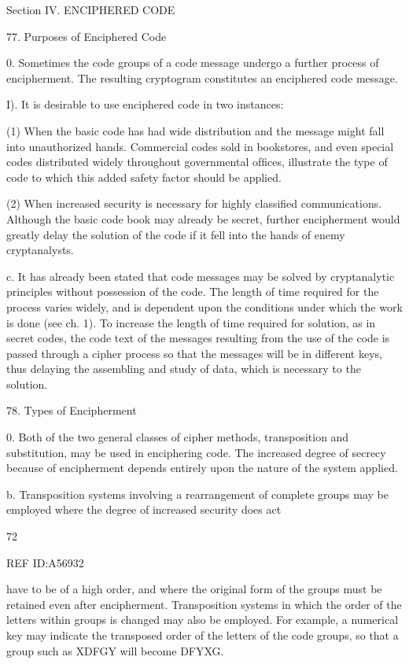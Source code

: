 Section IV. ENCIPHERED CODE

77. Purposes of Enciphered Code

0. Sometimes the code groups of a code message undergo a further
process of encipherment. The resulting cryptogram constitutes an
enciphered code message.

I). It is desirable to use enciphered code in two instances:

(1) When the basic code has had wide distribution and the message
might fall into unauthorized hands. Commercial codes sold in
bookstores, and even special codes distributed widely throughout
governmental ofﬁces, illustrate the type of code to which this
added safety factor should be applied.

(2) When increased security is necessary for highly classiﬁed
communications. Although the basic code book may already be
secret, further encipherment would greatly delay the solution of
the code if it fell into the hands of enemy cryptanalysts.

c. It has already been stated that code messages may be solved by
cryptanalytic principles without possession of the code. The length of
time required for the process varies widely, and is dependent upon the
conditions under which the work is done (see ch. 1). To increase the
length of time required for solution, as in secret codes, the code text of
the messages resulting from the use of the code is passed through a
cipher process so that the messages will be in different keys, thus delaying
the assembling and study of data, which is necessary to the solution.

78. Types of Encipherment

0. Both of the two general classes of cipher methods, transposition
and substitution, may be used in enciphering code. The increased degree
of secrecy because of encipherment depends entirely upon the nature of
the system applied.

b. Transposition systems involving a rearrangement of complete
groups may be employed where the degree of increased security does act

72

 

REF ID:A56932

have to be of a high order, and where the original form of the groups
must be retained even after encipherment. Transposition systems in
which the order of the letters within groups is changed may also be
employed. For example, a numerical key may indicate the transposed
order of the letters of the code groups, so that a group such as XDFGY
will become DFYXG.

